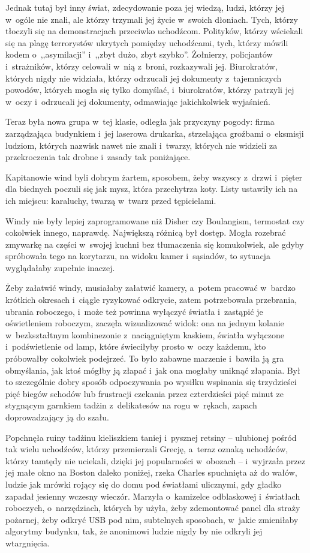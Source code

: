 \documentclass[oneside,polish,11pt,sfheadings]{mwbk}
\begin{document}
Jednak tutaj był inny świat, zdecydowanie poza jej wiedzą, ludzi, którzy
jej w~ogóle nie znali, ale którzy trzymali jej życie w~swoich dłoniach.
Tych, którzy tłoczyli się na demonstracjach przeciwko uchodźcom.
Polityków, którzy wściekali się na plagę terrorystów ukrytych pomiędzy
uchodźcami, tych, którzy mówili kodem o~,,asymilacji'' i~,,zbyt dużo,
zbyt szybko''. Żołnierzy, policjantów i~strażników, którzy celowali w~nią z~broni, rozkazywali jej. Biurokratów, których nigdy nie widziała,
którzy odrzucali jej dokumenty z~tajemniczych powodów, których mogła się
tylko domyślać, i~biurokratów, którzy patrzyli jej w~oczy i~odrzucali
jej dokumenty, odmawiając jakichkolwiek wyjaśnień.

Teraz była nowa grupa w~tej klasie, odległa jak przyczyny pogody: firma
zarządzająca budynkiem i~jej laserowa drukarka, strzelająca groźbami o~eksmisji ludziom, których nazwisk nawet nie znali i~twarzy, których nie
widzieli za przekroczenia tak drobne i~zasady tak poniżające.

Kapitanowie wind byli dobrym żartem, sposobem, żeby wszyscy z~drzwi i~pięter dla biednych poczuli się jak mysz, która przechytrza koty. Listy
ustawiły ich na ich miejscu: karaluchy, twarzą w~twarz przed
tępicielami.

Windy nie były lepiej zaprogramowane niż Disher czy Boulangism,
termostat czy cokolwiek innego, naprawdę. Największą różnicą był dostęp.
Mogła rozebrać zmywarkę na części w~swojej kuchni bez tłumaczenia się
komukolwiek, ale gdyby spróbowała tego na korytarzu, na widoku kamer i~sąsiadów, to sytuacja wyglądałaby zupełnie inaczej.

Żeby załatwić windy, musiałaby załatwić kamery, a~potem pracować w~bardzo krótkich okresach i~ciągle ryzykować odkrycie, zatem potrzebowała
przebrania, ubrania roboczego, i~może też powinna wyłączyć światła i~zastąpić je oświetleniem roboczym, zaczęła wizualizować widok: ona na
jednym kolanie w~bezkształtnym kombinezonie z~naciągniętym kaskiem,
światła wyłączone i~podświetlenie od lamp, które świeciłyby prosto w~oczy każdemu, kto próbowałby cokolwiek podejrzeć. To było zabawne
marzenie i~bawiła ją gra obmyślania, jak ktoś mógłby ją złapać i~jak ona
mogłaby uniknąć złapania. Był to szczególnie dobry sposób odpoczywania
po wysiłku wspinania się trzydzieści pięć biegów schodów lub frustracji
czekania przez czterdzieści pięć minut ze stygnącym garnkiem tadżin z~delikatesów na rogu w~rękach, zapach doprowadzający ją do szału.

Popchnęła ruiny tadżinu kieliszkiem taniej i~pysznej retsiny -- ulubionej
pośród tak wielu uchodźców, którzy przemierzali Grecję, a~teraz oznaką
uchodźców, którzy tamtędy nie uciekali, dzięki jej popularności w~obozach -- i~wyjrzała przez jej małe okno na Boston daleko poniżej, rzeka
Charles spuchnięta aż do wałów, ludzie jak mrówki rojący się do domu pod
światłami ulicznymi, gdy gładko zapadał jesienny wczesny wieczór.
Marzyła o~kamizelce odblaskowej i~światłach roboczych, o~narzędziach,
których by użyła, żeby zdemontować panel dla straży pożarnej, żeby
odkryć USB pod nim, subtelnych sposobach, w~jakie zmieniłaby algorytmy
budynku, tak, że anonimowi ludzie nigdy by nie odkryli jej wtargnięcia.
\end{document}
